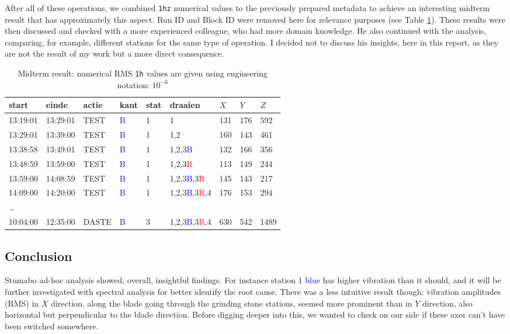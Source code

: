 After all of these operations, we combined \texttt{1hz} numerical values to the previously prepared metadata to achieve an interesting midterm result that has approximately this aspect. 
Run ID and Block ID were removed here for relevance purposes (see Table \ref{tab:stu_midterm_res}).  
These results were then discussed and checked with a more experienced colleague, who had more domain knowledge. 
He also continued with the analysis, comparing, for example, different stations for the same type of operation. 
I decided not to discuss his insights, here in this report, as they are not the result of my work but a more direct consequence.
\begin{table}[ht]
    \centering
    \begin{tabularx}{\textwidth}{@{}lllllllll@{}}
    \toprule
    start & einde & actie & kant & stat & draaien & $X$ & $Y$ & $Z$ \\ \midrule
    13:19:01 & 13:29:01 & TEST & \textcolor{blue}{B} & 1 & 1 & 131 & 176 & 592 \\ 
    13:29:01 & 13:39:00 & TEST & \textcolor{blue}{B} & 1 & 1,2 & 160 & 143 & 461 \\  
    13:38:58 & 13:49:01 & TEST & \textcolor{blue}{B} & 1 & 1,2,3\textcolor{blue}{B} & 132 & 166 & 356 \\ 
    13:48:59 & 13:59:00 & TEST & \textcolor{blue}{B} & 1 & 1,2,3\textcolor{red}{R} & 113 & 149 & 244  \\
    13:59:00 & 14:08:59 & TEST & \textcolor{blue}{B} & 1 & 1,2,3\textcolor{blue}{B},3\textcolor{red}{R} & 145 & 143 & 217 \\ 
    14:09:00 & 14:20:00 & TEST & \textcolor{blue}{B} & 1 & 1,2,3\textcolor{blue}{B},3\textcolor{red}{R},4 & 176 & 153 & 294 \\ 
    \dots \\
    10:04:00 & 12:35:00 & DASTE & \textcolor{blue}{B} & 3 & 1,2,3\textcolor{blue}{B},3\textcolor{red}{R},4 & 630 & 542 & 1489 \\
    \bottomrule
    \end{tabularx}
    \caption{Midterm result: numerical RMS \texttt{1h} values are given using engineering notation: $10^{-6}$}
    \label{tab:stu_midterm_res}
\end{table}

\clearpage
\subsection{Conclusion}
Stumabo ad-hoc analysis showed, overall, insightful findings. For instance station 1 \textcolor{blue}{blue} has higher vibration than it should, 
and it will be further investigated with spectral analysis for better identify the root cause.
There was a less intuitive result though: vibration amplitudes (RMS) in $X$ direction, along the blade going through the grinding stone stations,
seemed more prominent than in $Y$ direction, also horizontal but perpendicular to the blade direction.
Before digging deeper into this, we wanted to check on our side if these axes can't have been switched somewhere.

